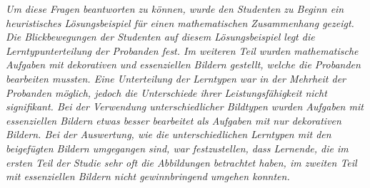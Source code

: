 \textit{Um diese Fragen beantworten zu können, wurde den Studenten zu Beginn ein heuristisches Lösungsbeispiel für einen mathematischen Zusammenhang gezeigt. Die Blickbewegungen der Studenten auf diesem Lösungsbeispiel legt die Lerntypunterteilung der Probanden fest. Im weiteren Teil wurden mathematische Aufgaben mit dekorativen und essenziellen Bildern gestellt, welche die Probanden bearbeiten mussten. Eine Unterteilung der Lerntypen war in der Mehrheit der Probanden möglich, jedoch die Unterschiede ihrer Leistungsfähigkeit nicht signifikant. Bei der Verwendung unterschiedlicher Bildtypen wurden Aufgaben mit essenziellen Bildern etwas besser bearbeitet als Aufgaben mit nur dekorativen Bildern. Bei der Auswertung, wie die unterschiedlichen Lerntypen mit den beigefügten Bildern umgegangen sind, war festzustellen, dass Lernende, die im ersten Teil der Studie sehr oft die Abbildungen betrachtet haben, im zweiten Teil mit essenziellen Bildern nicht gewinnbringend umgehen konnten.}


\tableofcontents %










\printbibliography
\clearpage

\listoffigures %

\printacronyms[title={Abkürzungsverzeichnis}] %

\listoftables %

\onehalfspacing
